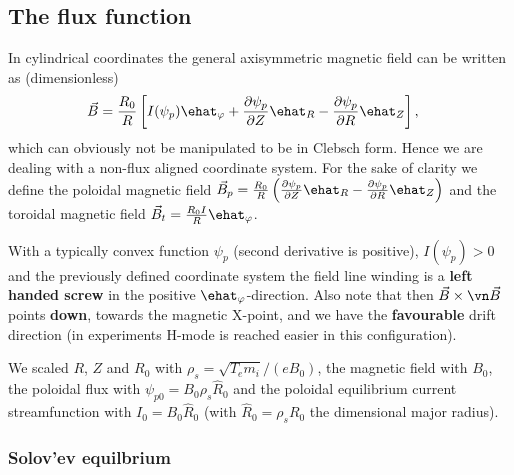 \subsection{The flux function}
In cylindrical coordinates the general axisymmetric  magnetic field can be written as (dimensionless)
\begin{align}
 \vec{B} &= \frac{R_0}{R}\left[I(\psi_p) \ehat_{\varphi} + \frac{\partial
 \psi_p}{\partial Z} \ehat_R -  \frac{\partial \psi_p}{\partial R} \ehat_Z\right] ,
\end{align}
which can obviously not be manipulated to be in Clebsch form.
Hence we are dealing with a non-flux aligned coordinate system.
For the sake of clarity we define the poloidal magnetic field \( \vec{B}_p = \frac{R_0}{R}\left( \frac{\partial \psi_p}{\partial Z}\ehat_R - \frac{\partial \psi_p}{\partial R}\ehat_Z\right)
\) and the toroidal magnetic field \(\vec{B}_t =\frac{R_0I}{R} \ehat_{\varphi}\).
\begin{tcolorbox}[title=Note]
With a typically convex function $\psi_p$ (second derivative is
positive), $I(\psi_p)>0$ and the previously defined coordinate system the field
line winding is a {\bf left handed screw} in the positive $\ehat_\varphi$-direction.
Also note that then $\vec B\times\vn\vec B$ points {\bf down}, towards the magnetic X-point,
and we have the {\bf favourable} drift direction (in experiments H-mode
is reached easier in this configuration).
\end{tcolorbox}


We scaled $R$, $Z$ and $R_0$ with $\rho_s = \sqrt{T_e m_i}/(eB_0)$, the
magnetic field with $B_0$, the poloidal flux with $\psi_{p0} = B_0\rho_s \hat
R_0$ and the poloidal equilibrium current streamfunction with $I_0 = B_0 \hat R_0$ (with $\hat R_0 =
\rho_s R_0$ the dimensional major radius).
\subsubsection{Solov'ev equilbrium}\label{sec:solovev}

